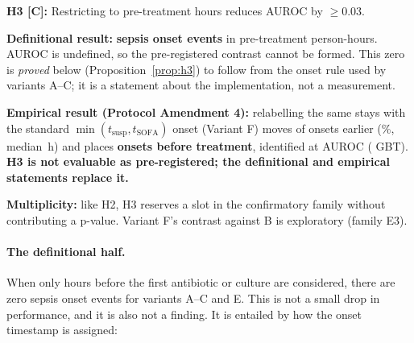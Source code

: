 \begin{mdframed}[backgroundcolor=ATUPurple!10, linecolor=ATUPurple]
    \textbf{H3 [C]:} Restricting to pre-treatment hours reduces AUROC by
    $\geq 0.03$.

    \textbf{Definitional result:} \textbf{\pcPreTreatOnsetsVarB{} sepsis onset
    events} in \pcPreTreatPersonHoursVarB{} pre-treatment person-hours. AUROC is
    undefined, so the pre-registered contrast cannot be formed. This zero is
    \emph{proved} below (Proposition~\ref{prop:h3}) to follow from the onset
    rule used by variants A--C; it is a statement about the implementation, not
    a measurement.

    \textbf{Empirical result (Protocol Amendment 4):} relabelling the same
    stays with the standard $\min(t_{\text{susp}}, t_{\text{SOFA}})$ onset
    (Variant F) moves \pcFNMovedEarlier{} of \pcFNOnsets{} onsets earlier
    (\pcFPctMovedEarlier\%, median \pcFMedianShiftH\,h) and places
    \textbf{\pcPreTreatOnsetsVarF{} onsets before treatment}, identified at
    \pcPreTreatAurocPrimaryF{} AUROC (\pcPreTreatAurocGbtF{} GBT).
    \textbf{H3 is not evaluable as pre-registered; the definitional and
    empirical statements replace it.}

    \textbf{Multiplicity:} like H2, H3 reserves a slot in the confirmatory
    family without contributing a p-value. Variant F's contrast against B is
    exploratory (family E3).
\end{mdframed}

\paragraph{The definitional half.}
When only hours before the first antibiotic or culture are considered, there
are zero sepsis onset events for variants A--C and E. This is not a small drop
in performance, and it is also not a finding. It is entailed by how the onset
timestamp is assigned:

